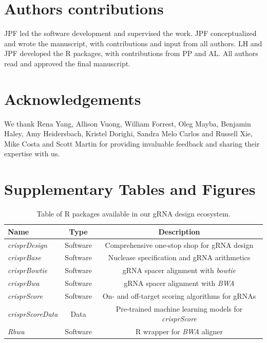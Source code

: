 \documentclass[pdftex,english,10pt]{article}
\begin{document}
{\section*{Authors contributions}

JPF led the software development and supervised the work.
JPF conceptualized and wrote the manuscript, with contributions and input from all authors. 
LH and JPF developed the R packages, with contributions from PP and AL. 
All authors read and approved the final manuscript.

\section*{Acknowledgements}

We thank Rena Yang, Allison Vuong, William Forrest, Oleg Mayba, Benjamin Haley, Amy Heidersbach, Kristel Dorighi, Sandra Melo Carlos and Russell Xie, Mike Costa and Scott Martin for providing invaluable feedback and sharing their expertise with us. 








\clearpage
\section*{Supplementary Tables and Figures}

\renewcommand{\figurename}{Supplementary Figure}
\setcounter{figure}{0}
\makeatletter 
\renewcommand{\thefigure}{S\@arabic\c@figure}
\makeatother


\renewcommand{\tablename}{Supplementary Table}
\setcounter{table}{0}
\makeatletter 
\renewcommand{\thetable}{S\@arabic\c@table}
\makeatother




\begin{table}[h!]
\centering
\begin{tabular}{l|c|c}
Name & Type & Description   \\ \hline
\textit{crisprDesign} & Software & Comprehensive one-stop shop for gRNA design   \\
\textit{crisprBase} & Software & Nuclease specification and gRNA arithmetics   \\
\textit{crisprBowtie} & Software & gRNA spacer alignment with \textit{bowtie}   \\
\textit{crisprBwa} & Software & gRNA spacer alignment with \textit{BWA}   \\   
\textit{crisprScore} & Software & On- and off-target scoring algorithms for gRNAs   \\
\textit{crisprScoreData} & Data & Pre-trained machine learning models for \textit{crisprScore}   \\
\textit{Rbwa} & Software & R wrapper for \textit{BWA} aligner \\
\end{tabular}
\caption{Table of R packages available in our gRNA design ecosystem. }
\label{supptab:packages}
\end{table}



}
\end{document}
